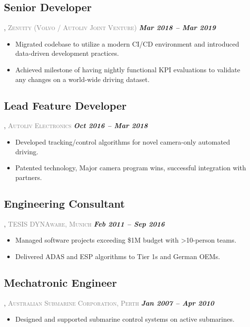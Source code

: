 \documentclass[10pt,a4paper]{article}
\begin{document}
\subsection*{\textbf{\textcolor{jobtitlegreen}{Senior Developer}}}, 
    \textcolor{gray}{\scshape Zenuity (Volvo / Autoliv Joint Venture)} \hfill \textcolor{primary}{\textbf{\textit{{Mar 2018 – Mar 2019}}}}
\begin{itemize}
    \item Migrated codebase to utilize a modern CI/CD environment and introduced data-driven development practices.
    \item Achieved milestone of having nightly functional KPI evaluations to validate any changes on a world-wide driving dataset.
\end{itemize}

\subsection*{\textbf{\textcolor{jobtitlegreen}{Lead Feature Developer}}}, 
    \textcolor{gray}{\scshape Autoliv Electronics} \hfill \textcolor{primary}{\textbf{\textit{{Oct 2016 – Mar 2018}}}}
\begin{itemize}
    \item Developed tracking/control algorithms for novel camera-only automated driving.
    \item Patented technology, Major camera program wins, successful integration with partners.
\end{itemize}

\subsection*{\textbf{\textcolor{jobtitlegreen}{Engineering Consultant}}}, 
\textcolor{gray}{\scshape TESIS DYNAware, Munich} \hfill \textcolor{primary}{\textbf{\textit{{Feb 2011 – Sep 2016}}}}
\begin{itemize}
    \item Managed software projects exceeding \$1M budget with >10-person teams.
    \item Delivered ADAS and ESP algorithms to Tier 1s and German OEMs.
\end{itemize}

\subsection*{\textbf{\textcolor{jobtitlegreen}{Mechatronic Engineer}}}, 
\textcolor{gray}{\scshape Australian Submarine Corporation, Perth} \hfill \textcolor{primary}{\textbf{\textit{{Jan 2007 – Apr 2010}}}}
\begin{itemize}
    \item Designed and supported submarine control systems on active submarines.
\end{itemize}
\end{document}

